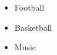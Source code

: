 %
%
%

\twocolumnsection
{
\begin{skills}
\end{skills}}
{
\vspace{1em}
\begin{itemize}
	\item Football
	\item Basketball                    
    \item Music
\end{itemize}
}
